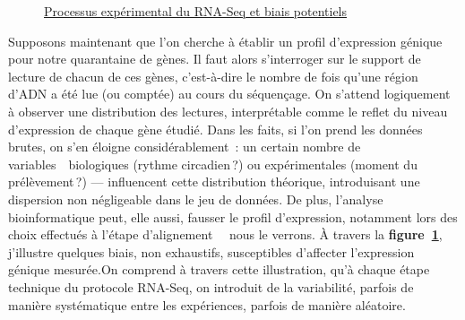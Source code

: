 \begin{figure}
{
 }
 \caption{\underline{Processus expérimental du RNA-Seq et biais potentiels}}
 \label{fig:biaisRNA}
 \end{figure}

Supposons maintenant que l’on cherche à établir un profil d’expression génique pour notre quarantaine de gènes.  
Il faut alors s’interroger sur le support de lecture de chacun de ces gènes, c’est-à-dire le nombre de fois qu’une région d’ADN a été lue (ou comptée) au cours du séquençage.  
On s’attend logiquement à observer une distribution des lectures, interprétable comme le reflet du niveau d’expression de chaque gène étudié.  
Dans les faits, si l’on prend les données brutes, on s’en éloigne considérablement : un certain nombre de variables~\textemdash~biologiques (rythme circadien ?) ou expérimentales (moment du prélèvement ?) —  
influencent cette distribution théorique, introduisant une dispersion non négligeable dans le jeu de données.  
De plus, l’analyse bioinformatique peut, elle aussi, fausser le profil d’expression, notamment lors des choix effectués à l’étape d’alignement~ \textemdash ~nous le verrons.  
À travers la \textbf{figure~\ref{fig:biaisRNA}}, j’illustre quelques biais, non exhaustifs, susceptibles d’affecter l’expression génique mesurée.On comprend à travers cette illustration,
 qu’à chaque étape technique du protocole RNA-Seq, on introduit de la variabilité, parfois de manière systématique entre les expériences, parfois de manière aléatoire.\\
 
